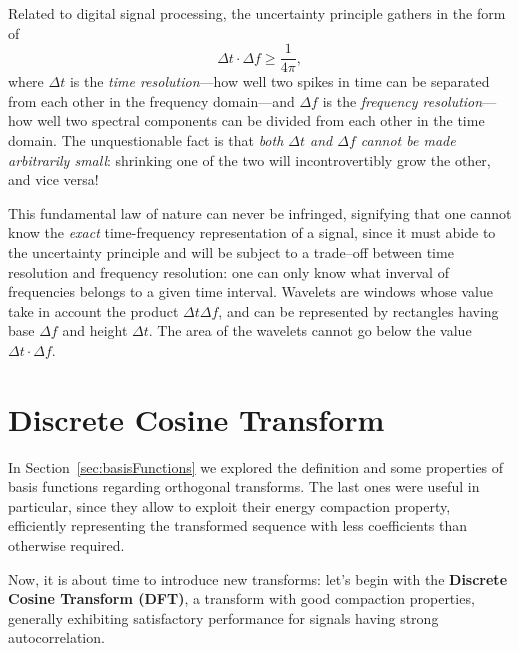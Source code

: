 \documentclass[\documentfontsize, twocolumn]{\classname}
\begin{document}
Related to digital signal processing, the uncertainty principle gathers in the
form of
\begin{equation}\label{eqn:uncertaintyPrinciple}
    \Delta t \cdot \Delta f \geq \frac 1 {4\pi},
\end{equation}
where $\Delta t$ is the \emph{time resolution}---how well two spikes in time can be separated from each other in the frequency domain---and $\Delta f$ is the \emph{frequency resolution}---how well two spectral components can be divided from each other in the time domain. The unquestionable fact is that \emph{both $\Delta t$ and $\Delta f$ cannot be made arbitrarily small}: shrinking one of the two will incontrovertibly grow the other, and vice versa!

This fundamental law of nature can never be infringed, signifying that one cannot know the \emph{exact} time-frequency representation of a signal, since it must abide to the uncertainty principle and will be subject to a trade--off between time resolution and frequency resolution: one can only know what inverval of frequencies belongs to a given time interval. Wavelets are windows whose value take in account the product $\Delta t \Delta f$, and can be represented by rectangles having base $\Delta f$ and height $\Delta t$. The area of the wavelets cannot go below the value $\Delta t \cdot \Delta f$.

\section{Discrete Cosine Transform}\label{sec:discreteCosineTransform}

In Section~\ref{sec:basisFunctions} we explored the definition and some properties of basis functions regarding orthogonal transforms. The last ones were useful in particular, since they allow to exploit their energy compaction property, efficiently representing the transformed sequence with less coefficients than otherwise required.

Now, it is about time to introduce new transforms: let's begin with the \textbf{Discrete Cosine Transform (DFT)}, a transform with good compaction properties, generally exhibiting satisfactory performance for signals having strong autocorrelation.
\end{document}
